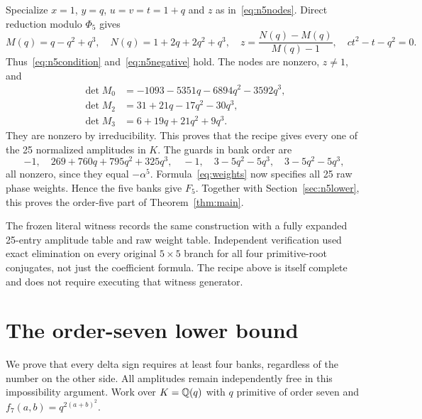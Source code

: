\documentclass[11pt,letterpaper]{article}
\theoremstyle{definition}\newtheorem{definition}[theorem]{Definition}
\begin{document}
Specialize $x=1$, $y=q$, $u=v=t=1+q$ and $z$ as in~\eqref{eq:n5nodes}. Direct reduction modulo $\Phi_5$ gives
\[
 M(q)=q-q^2+q^3,\quad N(q)=1+2q+2q^2+q^3,
 \quad z=\frac{N(q)-M(q)}{M(q)-1},\quad ct^2-t-q^2=0.
\]
Thus~\eqref{eq:n5condition} and~\eqref{eq:n5negative} hold. The nodes are nonzero, $z\ne1$, and
\begin{align*}
 \det M_0&=-1093-5351q-6894q^2-3592q^3,\\
 \det M_2&=31+21q-17q^2-30q^3,\\
 \det M_3&=6+19q+21q^2+9q^3.
\end{align*}
They are nonzero by irreducibility. This proves that the recipe gives every one of the 25 normalized amplitudes in $K$. The guards in bank order are
\[
 -1,\quad 269+760q+795q^2+325q^3,\quad -1,
 \quad3-5q^2-5q^3,\quad3-5q^2-5q^3,
\]
all nonzero, since they equal $-\alpha^5$. Formula~\eqref{eq:weights} now specifies all 25 raw phase weights. Hence the five banks give $F_5$. Together with Section~\ref{sec:n5lower}, this proves the order-five part of Theorem~\ref{thm:main}.

The frozen literal witness records the same construction with a fully expanded 25-entry amplitude table and raw weight table. Independent verification used exact elimination on every original $5\times5$ branch for all four primitive-root conjugates, not just the coefficient formula. The recipe above is itself complete and does not require executing that witness generator.

\section{The order-seven lower bound}\label{sec:n7lower}

We prove that every delta sign requires at least four banks, regardless of the number on the other side. All amplitudes remain independently free in this impossibility argument. Work over $K=\mathbb Q(q)$ with $q$ primitive of order seven and $f_7(a,b)=q^{2(a+b)^2}$.
\end{document}

